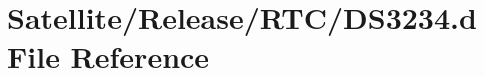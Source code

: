 \hypertarget{_release_2_r_t_c_2_d_s3234_8d}{\section{Satellite/\-Release/\-R\-T\-C/\-D\-S3234.d File Reference}
\label{_release_2_r_t_c_2_d_s3234_8d}
}
